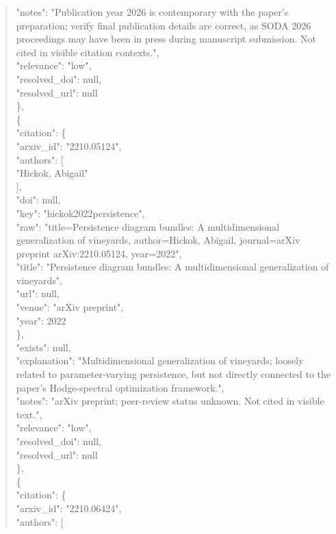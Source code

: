 \documentclass[11pt]{article}
\begin{document}
\begin{quote}
      "notes": "Publication year 2026 is contemporary with the paper's preparation; verify final publication details are correct, as SODA 2026 proceedings may have been in press during manuscript submission. Not cited in visible citation contexts.",\\
      "relevance": "low",\\
      "resolved\_doi": null,\\
      "resolved\_url": null\\
    \},\\
    \{\\
      "citation": \{\\
        "arxiv\_id": "2210.05124",\\
        "authors": [\\
          "Hickok, Abigail"\\
        ],\\
        "doi": null,\\
        "key": "hickok2022persistence",\\
        "raw": "title=Persistence diagram bundles: A multidimensional generalization of vineyards, author=Hickok, Abigail, journal=arXiv preprint arXiv:2210.05124, year=2022",\\
        "title": "Persistence diagram bundles: A multidimensional generalization of vineyards",\\
        "url": null,\\
        "venue": "arXiv preprint",\\
        "year": 2022\\
      \},\\
      "exists": null,\\
      "explanation": "Multidimensional generalization of vineyards; loosely related to parameter-varying persistence, but not directly connected to the paper's Hodge-spectral optimization framework.",\\
      "notes": "arXiv preprint; peer-review status unknown. Not cited in visible text.",\\
      "relevance": "low",\\
      "resolved\_doi": null,\\
      "resolved\_url": null\\
    \},\\
    \{\\
      "citation": \{\\
        "arxiv\_id": "2210.06424",\\
        "authors": [\\

\end{quote}
\end{document}
